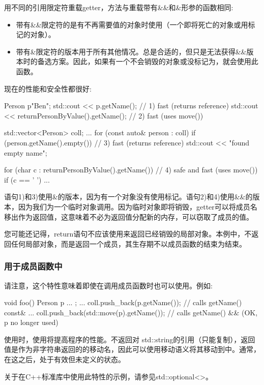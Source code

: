 用不同的引用限定符重载getter，方法与重载带有\&\&和\&形参的函数相同:

\begin{itemize}
	\item 带有\&\&限定符的是有不再需要值的对象时使用（一个即将死亡的对象或用标记的对象）。
	\item 带有\&限定符的版本用于所有其他情况。总是合适的，但只是无法获得\&\&版本时的备选方案。因此，如果有一个不会销毁的对象或没标记为，就会使用此函数。
\end{itemize}

现在的性能和安全性都很好:

\begin{cppcode}
Person p{"Ben"};
std::cout << p.getName(); // 1) fast (returns reference)
std::cout << returnPersonByValue().getName(); // 2) fast (uses move())

std::vector<Person> coll;
...
for (const auto& person : coll) {
	if (person.getName().empty()) { // 3) fast (returns reference)
		std::cout << "found empty name\n";
	}
}

for (char c : returnPersonByValue().getName()) { // 4) safe and fast (uses move())
	if (c == ' ') {
		...
	}
}
\end{cppcode}

语句1)和3)使用\&的版本，因为有一个对象没有使用标记。语句2)和4)使用\&\&的版本，因为我们为一个临时对象调用。因为临时对象即将销毁，getter可以将成员名移出作为返回值，这意味着不必为返回值分配新的内存，可以窃取了成员的值。

您可能还记得，return语句不应该使用来返回已经销毁的局部对象。本例中，不返回任何局部对象，而是返回一个成员，其生存期不以成员函数的结束为结束。

\subsubsection{用于成员函数中}

请注意，这个特性意味着即使在调用成员函数时也可以使用。例如:

\begin{cppcode}
void foo()
{
	Person p{ ... };
	...
	coll.push_back(p.getName()); // calls getName() const&
	...
	coll.push_back(std::move(p).getName()); // calls getName() && (OK, p no longer used)
}
\end{cppcode}

使用时，使用将提高程序的性能。不返回对 std::string的引用（只能复制），返回值是作为非字符串返回的的移动名，因此可以使用移动语义将其移动到中。通常，在这之后，处于有效但未定义的状态。

关于在C++标准库中使用此特性的示例，请参见std::optional<>。
















